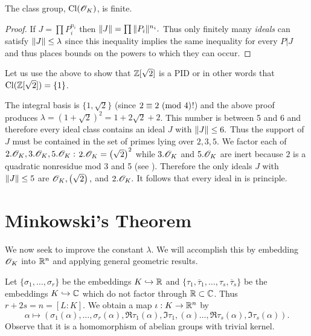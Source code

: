 \documentclass[10pt,a4paper,reqno]{amsart}
\begin{document}
\begin{cor} The class group, $\mathrm{Cl}(\mathscr{O}_K)$, is finite.
\end{cor}
\begin{proof}
If $J = \prod P_i^{n_i}$ then $\| J\| = \prod \| P_i\|^{n_i}.$ Thus only
finitely many \emph{ideals} can satisfy $\| J\| \le \lambda$ since this
inequality implies the same inequality for every $P | J$ and thus places bounds
on the powers to which they can occur.
\end{proof}

\begin{eg}
Let us use the above to show that $\mathbb{Z}[\sqrt{2}]$ is a PID or in other words
that $\mathrm{Cl}(\mathbb{Z}[\sqrt{2}])= \{1\}$.

The integral basis is $\{1,\sqrt{2}\}$ (since $2 \equiv 2 \text{ } (\mathrm{mod}\text{ } 4)$!) and the
above proof produces $\lambda = (1+\sqrt{2})^2 = 1 + 2\sqrt{2} + 2$. This
number is between 5 and 6 and therefore every ideal class contains an ideal $J$
with $\| J\| \le 6.$ Thus the support of $J$ must be contained in the set of
primes lying over $2,3,5$. We factor each of $2.\mathscr{O}_K, 3.\mathscr{O}_K, 5.\mathscr{O}_K:$ $2.\mathscr{O}_K =
\left( \sqrt{2} \right)^2$ while $3.\mathscr{O}_K$ and $5.\mathscr{O}_K$ are inert because $2$ is a
quadratic nonresidue mod 3 and 5 (see \cite[Theorem 25,p.74]{M}). Therefore the
only ideals $J$ with $\| J\| \le 5$ are $\mathscr{O}_K, \left( \sqrt{2} \right),$ and
$2.\mathscr{O}_K.$ It follows that every ideal in \OK{} is principle.
\end{eg}

\section{Minkowski's Theorem}

\begin{ap}
We now seek to improve the constant $\lambda$. We will accomplish this by
embedding $\mathscr{O}_K$ into $\mathbb{R}^n$ and applying general geometric results.

Let $\{\sigma_1,\dots,\sigma_r\}$ be the embeddings $K\hookrightarrow \mathbb{R}$ and
$\{\tau_1, \overline{\tau}_1,\dots,\tau_s,\overline{\tau}_s \}$ be the
embeddings $K \hookrightarrow \mathbb{C}$ which do not factor through $\mathbb{R} \subset \mathbb{C}$.
Thus $r+2s = n = [L:K].$ We obtain a map $\iota: K\rightarrow \mathbb{R}^n$ by \[\alpha
\mapsto (\sigma_1(\alpha), \dots, \sigma_r(\alpha), \Re{\tau_1(\alpha)},
\Im{\tau_1,(\alpha)}\dots, \Re{\tau_s(\alpha)}, \Im{\tau_s(\alpha)}).\] Observe
that it is a homomorphism of abelian groups with trivial kernel.
\end{ap}
\end{document}
